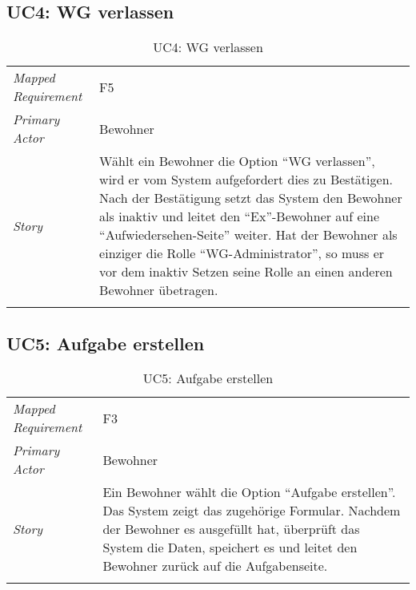\subsection{UC4: WG verlassen}\label{subsec:uc4}
\begin{table}[H]
	\tablestyle
	\tablealtcolored
	\begin{tabularx}{\textwidth}{lX}
		\tablebody
			\textit{Mapped Requirement} &
			F5
			\tabularnewline
			\textit{Primary Actor} &
			Bewohner
			\tabularnewline
			\textit{Story} &
			Wählt ein Bewohner die Option ``WG verlassen'', wird er vom System aufgefordert dies zu Bestätigen. Nach der Bestätigung setzt das System den Bewohner als inaktiv und leitet den ``Ex''-Bewohner auf eine ``Aufwiedersehen-Seite'' weiter. \newline
			Hat der Bewohner als einziger die Rolle ``WG-Administrator'', so muss er vor dem inaktiv Setzen seine Rolle an einen anderen Bewohner übetragen.
			\tabularnewline
		\tableend
	\end{tabularx}
	\caption{UC4: WG verlassen}
\end{table}


\subsection{UC5: Aufgabe erstellen}\label{subsec:uc5}
\begin{table}[H]
	\tablestyle
	\tablealtcolored
	\begin{tabularx}{\textwidth}{lX}
		\tablebody
			\textit{Mapped Requirement} &
			F3
			\tabularnewline
			\textit{Primary Actor} &
			Bewohner
			\tabularnewline
			\textit{Story} &
			Ein Bewohner wählt die Option ``Aufgabe erstellen''. Das System zeigt das zugehörige Formular. Nachdem der Bewohner es ausgefüllt hat, überprüft das System die Daten, speichert es und leitet den Bewohner zurück auf die Aufgabenseite.
			\tabularnewline
		\tableend
	\end{tabularx}
	\caption{UC5: Aufgabe erstellen}
\end{table}


